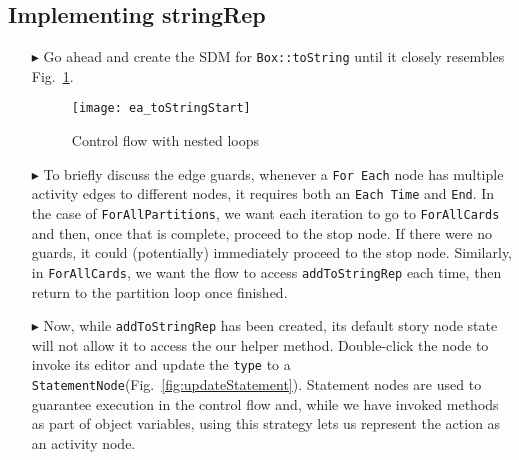 \newpage
\hypertarget{stringRep vis}{}
\subsection{Implementing stringRep}
\visHeader

\begin{itemize}

\item[$\blacktriangleright$] Go ahead and create the SDM for \texttt{Box::toString} until it closely resembles Fig.~\ref{fig:sdm_tostring_1}. 

\vspace{0.5cm}

\begin{figure}[htbp]
\begin{center}
  \texttt{[image: ea\_toStringStart]}
  \caption{Control flow with nested loops} 
  \label{fig:sdm_tostring_1}
\end{center}
\end{figure}

\clearpage

\item[$\blacktriangleright$] To briefly discuss the edge guards, whenever a \texttt{For Each} node has multiple activity edges to different nodes, it requires
both an \texttt{Each Time} and \texttt{End}. In the case of \texttt{ForAllPartitions}, we want each iteration to go to \texttt{ForAllCards} and then, once that
is complete, proceed to the stop node. If there were no guards, it could (potentially) immediately proceed to the stop node. Similarly, in \texttt{ForAllCards},
we want the flow to access \texttt{addToStringRep} each time, then return to the partition loop once finished.

\vspace{0.5cm}

\item[$\blacktriangleright$] Now, while \texttt{addToStringRep} has been created, its default story node state will not allow it to access the our helper
method. Double-click the node to invoke its editor and update the \texttt{type} to a \texttt{StatementNode}(Fig.~\ref{fig:updateStatement}). Statement nodes are used to guarantee execution in the control flow and, while we have invoked methods as part of object
variables, using this strategy lets us represent the action as an activity node.

\vspace{0.5cm}


\end{itemize}
